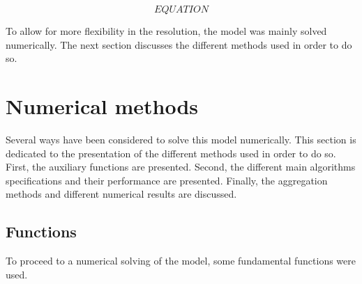 \documentclass{article}
\begin{document}
$$EQUATION$$

To allow for more flexibility in the resolution, the model was mainly solved
numerically.
The next section discusses the different methods used in order to do so.

\section{Numerical methods}

Several ways have been considered to solve this model numerically. 
This section is dedicated to the presentation of the different methods
used in order to do so. 
First, the auxiliary functions are presented. 
Second, the different main algorithms specifications and their performance are presented. 
Finally, the aggregation methods and different numerical results are discussed.

\subsection{Functions}

To proceed to a numerical solving of the model,  
some fundamental functions were used.
\end{document}
